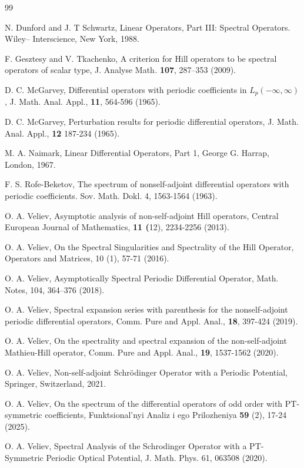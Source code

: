 \documentclass{article}%
\begin{document}
\begin{thebibliography}{99}                                                                                               %


\bibitem {}N. Dunford and J. T Schwartz, Linear Operators, Part III: Spectral
Operators. Wiley-- Interscience, New York, 1988.

\bibitem {}F. Gesztesy and V. Tkachenko, A criterion for Hill operators to be
spectral operators of scalar type, J. Analyse Math\textit{.} \textbf{107},
287--353 (2009).

\bibitem {}D. C. McGarvey, Differential operators with periodic coefficients
in $L_{p}(-\infty,\infty)$, J. Math. Anal. Appl., \textbf{11}, 564-596 (1965).

\bibitem {}D. C. McGarvey, Perturbation results for periodic differential
operators, J. Math. Anal. Appl., \textbf{12} 187-234 (1965).

\bibitem {}M. A. Naimark, Linear Differential Operators, Part 1, George G.
Harrap, London, 1967.

\bibitem {}F. S. Rofe-Beketov, The spectrum of nonself-adjoint differential
operators with periodic coefficients. Sov. Math. Dokl. {4}, 1563-1564 (1963).

\bibitem {}O. A. Veliev, Asymptotic analysis of non-self-adjoint Hill
operators, Central European Journal of Mathematics, \textbf{11 (}12),
2234-2256 (2013).

\bibitem {}O. A. Veliev, On the Spectral Singularities and Spectrality of the
Hill Operator, Operators and Matrices, 10 (1), 57-71 (2016).

\bibitem {}O. A. Veliev, Asymptotically Spectral Periodic Differential
Operator, Math. Notes, 104, 364--376 (2018).

\bibitem {}O. A. Veliev, Spectral expansion series with parenthesis for the
nonself-adjoint periodic differential operators, Comm. Pure and Appl. Anal.,
\textbf{18}, 397-424 (2019).

\bibitem {}O. A. Veliev, On the spectrality and spectral expansion of the
non-self-adjoint Mathieu-Hill operator, Comm. Pure and Appl. Anal.,
\textbf{19}, 1537-1562 (2020).

\bibitem {}O. A. Veliev, Non-self-adjoint Schr\"{o}dinger Operator with a
Periodic Potential, Springer, Switzerland, 2021.

\bibitem {}O. A. Veliev, On the spectrum of the differential operators of odd
order with PT-symmetric coefficients, Funktsional'nyi Analiz i ego
Prilozheniya \textbf{59} (2), 17-24 (2025).

\bibitem {}O. A. Veliev, Spectral Analysis of the Schrodinger Operator with a
PT-Symmetric Periodic Optical Potential, J. Math. Phys. 61, 063508 (2020).
\end{thebibliography}
\end{document}
